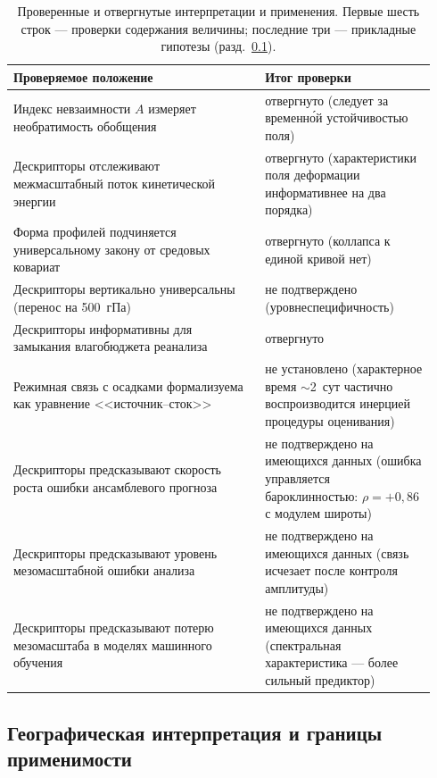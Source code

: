 \documentclass[11pt,a4paper]{article}
\begin{document}
\begin{table}[H]
\centering
\caption{Проверенные и отвергнутые интерпретации и применения. Первые шесть строк --- проверки содержания величины; последние три --- прикладные гипотезы (разд.~\ref{sec:geo}).}
\label{tab:negative}
\small
\begin{tabular}{@{}p{0.56\linewidth}p{0.38\linewidth}@{}}
\toprule
Проверяемое положение & Итог проверки\\
\midrule
Индекс невзаимности $A$ измеряет необратимость обобщения & отвергнуто (следует за временн\'{о}й устойчивостью поля)\\
Дескрипторы отслеживают межмасштабный поток кинетической энергии \cite{Germano1992,Aluie2018} & отвергнуто (характеристики поля деформации информативнее на два порядка)\\
Форма профилей подчиняется универсальному закону от средовых ковариат & отвергнуто (коллапса к единой кривой нет)\\
Дескрипторы вертикально универсальны (перенос на 500~гПа) & не подтверждено (уровнеспецифичность)\\
Дескрипторы информативны для замыкания влагобюджета реанализа \cite{Trenberth1991,Mayer2021} & отвергнуто\\
Режимная связь с осадками формализуема как уравнение <<источник--сток>> \cite{Masunaga2012,PetersNeelin2006} & не установлено (характерное время $\sim$2~сут частично воспроизводится инерцией процедуры оценивания)\\
Дескрипторы предсказывают скорость роста ошибки ансамблевого прогноза & не подтверждено на имеющихся данных (ошибка управляется бароклинностью: $\rho=+0{,}86$ с модулем широты)\\
Дескрипторы предсказывают уровень мезомасштабной ошибки анализа & не подтверждено на имеющихся данных (связь исчезает после контроля амплитуды)\\
Дескрипторы предсказывают потерю мезомасштаба в моделях машинного обучения \cite{Lam2023,Bi2023,Price2025,Rasp2024} & не подтверждено на имеющихся данных (спектральная характеристика --- более сильный предиктор)\\
\bottomrule
\end{tabular}
\end{table}

\subsection{Географическая интерпретация и границы применимости}
\label{sec:geo}
\end{document}
